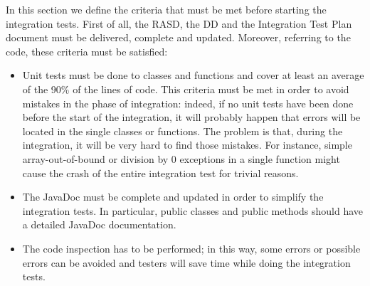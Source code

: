 In this section we define the criteria that must be met before starting the integration tests.
\newline
First of all, the RASD, the DD and the Integration Test Plan document must be delivered, complete and updated.
Moreover, referring to the code, these criteria must be satisfied:
\begin{itemize}
    \item Unit tests must be done to classes and functions and cover at least an average of the 90\% of the lines of code. This criteria must be met in order to avoid mistakes in the phase of integration: indeed, if no unit tests have been done before the start of the integration, it will probably happen that errors will be located in the single classes or functions. The problem is that, during the integration, it will be very hard to find those mistakes. For instance, simple array-out-of-bound or division by 0 exceptions in a single function might cause the crash of the entire integration test for trivial reasons.
    \item The JavaDoc must be complete and updated in order to simplify the integration tests. In particular, public classes and public methods should have a detailed JavaDoc documentation. 
    \item The code inspection has to be performed; in this way, some errors or possible errors can be avoided and testers will save time while doing the integration tests.
\end{itemize}